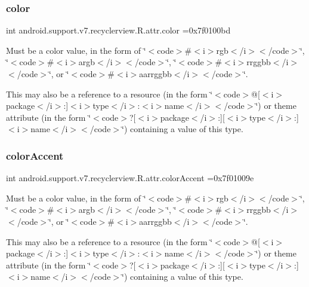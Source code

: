 \subsubsection{\texorpdfstring{color}{color}}
{\footnotesize\ttfamily int android.\+support.\+v7.\+recyclerview.\+R.\+attr.\+color =0x7f0100bd\hspace{0.3cm}{\ttfamily [static]}}

Must be a color value, in the form of \char`\"{}$<$code$>$\#$<$i$>$rgb$<$/i$>$$<$/code$>$\char`\"{}, \char`\"{}$<$code$>$\#$<$i$>$argb$<$/i$>$$<$/code$>$\char`\"{}, \char`\"{}$<$code$>$\#$<$i$>$rrggbb$<$/i$>$$<$/code$>$\char`\"{}, or \char`\"{}$<$code$>$\#$<$i$>$aarrggbb$<$/i$>$$<$/code$>$\char`\"{}. 

This may also be a reference to a resource (in the form \char`\"{}$<$code$>$@\mbox{[}$<$i$>$package$<$/i$>$\+:\mbox{]}$<$i$>$type$<$/i$>$\+:$<$i$>$name$<$/i$>$$<$/code$>$\char`\"{}) or theme attribute (in the form \char`\"{}$<$code$>$?\mbox{[}$<$i$>$package$<$/i$>$\+:\mbox{]}\mbox{[}$<$i$>$type$<$/i$>$\+:\mbox{]}$<$i$>$name$<$/i$>$$<$/code$>$\char`\"{}) containing a value of this type. \mbox{\label{classandroid_1_1support_1_1v7_1_1recyclerview_1_1R_1_1attr_a9623888efd01b3dafab806bc5fcad415}} 
\subsubsection{\texorpdfstring{color\+Accent}{colorAccent}}
{\footnotesize\ttfamily int android.\+support.\+v7.\+recyclerview.\+R.\+attr.\+color\+Accent =0x7f01009e\hspace{0.3cm}{\ttfamily [static]}}

Must be a color value, in the form of \char`\"{}$<$code$>$\#$<$i$>$rgb$<$/i$>$$<$/code$>$\char`\"{}, \char`\"{}$<$code$>$\#$<$i$>$argb$<$/i$>$$<$/code$>$\char`\"{}, \char`\"{}$<$code$>$\#$<$i$>$rrggbb$<$/i$>$$<$/code$>$\char`\"{}, or \char`\"{}$<$code$>$\#$<$i$>$aarrggbb$<$/i$>$$<$/code$>$\char`\"{}. 

This may also be a reference to a resource (in the form \char`\"{}$<$code$>$@\mbox{[}$<$i$>$package$<$/i$>$\+:\mbox{]}$<$i$>$type$<$/i$>$\+:$<$i$>$name$<$/i$>$$<$/code$>$\char`\"{}) or theme attribute (in the form \char`\"{}$<$code$>$?\mbox{[}$<$i$>$package$<$/i$>$\+:\mbox{]}\mbox{[}$<$i$>$type$<$/i$>$\+:\mbox{]}$<$i$>$name$<$/i$>$$<$/code$>$\char`\"{}) containing a value of this type. \mbox{\label{classandroid_1_1support_1_1v7_1_1recyclerview_1_1R_1_1attr_a56dfc59cf465f2eca091254e34c69ef0}} 
